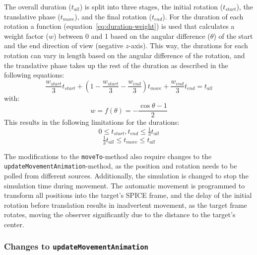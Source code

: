 The overall duration ($t_{all}$) is split into three stages, the initial rotation ($t_{start}$), the translative phase
($t_{move}$), and the final rotation ($t_{end}$).
For the duration of each rotation a function (equation~\ref{eq:duration-weight}) is used that calculates a weight
factor ($w$) between 0 and 1 based on the angular difference ($\theta$) of the start and the end direction of view
(negative $z$-axis).
This way, the durations for each rotation can vary in length based on the angular difference of the rotation, and the
translative phase takes up the rest of the duration as described in the following equations:
\begin{equation}
    \label{eq:duration-timings}
    \frac{w_{start}}{3} t_{start} + (1 - \frac{w_{start}}{3} - \frac{w_{end}}{3}) t_{move} +
    \frac{w_{end}}{3} t_{end} = t_{all}
\end{equation}
with:
\begin{equation}
    \label{eq:duration-weight}
    w = f(\theta) = - \frac{\cos{\theta} - 1}{2}
\end{equation}
This results in the following limitations for the durations:
\begin{equation}
    \label{eq:duration-result-rot}
    0 \leq t_{start}, t_{end} \leq \tfrac{1}{3} t_{all}
\end{equation}
\begin{equation}
    \label{eq:duration-result-mov}
    \tfrac{1}{3} t_{all} \leq t_{move} \leq t_{all}
\end{equation}

The modifications to the \texttt{moveTo}-method also require changes to the
\texttt{updateMovementAnimation}-method, as the position and rotation needs to be polled from different sources.
Additionally, the simulation is changed to stop the simulation time during movement.
The automatic movement is programmed to transform all positions into the target's SPICE frame, and the delay of the
initial rotation before translation results in inadvertent movement, as the target frame rotates, moving the observer
significantly due to the distance to the target's center.

\subsubsection{Changes to \texttt{updateMovementAnimation}}\label{subsubsec:changes-to-updatemovementanimation}

